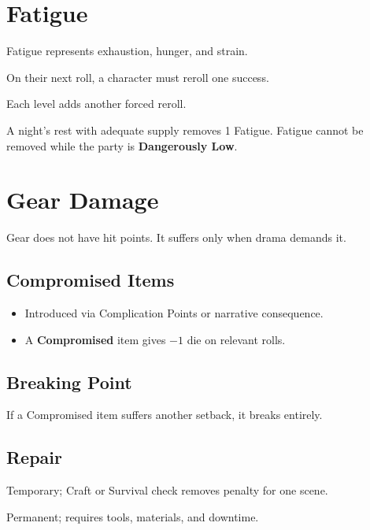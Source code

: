 \documentclass[12pt]{book}
\begin{document}
\section{Fatigue}
Fatigue represents exhaustion, hunger, and strain.

\begin{description}[leftmargin=2cm]
  \item[Effect:] On their next roll, a character must reroll one success.
  \item[Stacking:] Each level adds another forced reroll.
  \item[Recovery:] A night’s rest with adequate supply removes 1 Fatigue.
    Fatigue cannot be removed while the party is \textbf{Dangerously Low}.
\end{description}

\section{Gear Damage}
Gear does not have hit points. It suffers only when drama demands it.

\subsection*{Compromised Items}
\begin{itemize}
  \item Introduced via Complication Points or narrative consequence.
  \item A \textbf{Compromised} item gives \(-1\) die on relevant rolls.
\end{itemize}

\subsection*{Breaking Point}
If a Compromised item suffers another setback, it breaks entirely.

\subsection*{Repair}
\begin{description}[leftmargin=2cm]
  \item[Field Repair:] Temporary; Craft or Survival check removes penalty for
    one scene.
  \item[Proper Repair:] Permanent; requires tools, materials, and downtime.
\end{description}
\end{document}
